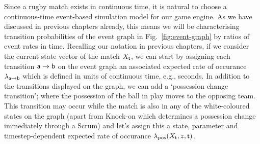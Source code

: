 Since a rugby match exists in continuous time, it is natural to choose a continuous-time event-based simulation model for our game engine. As we have discussed in previous chapters already, this means we will be characterising transition probabilities of the event graph in Fig.~\ref{fig:event-graph} by ratios of event rates in time. Recalling our notation in previous chapters, if we consider the current state vector of the match $X_{\sf t}$, we can start by assigning each transition ${\sf a}\rightarrow {\sf b}$ on the event graph an associated expected rate of occurance $\lambda_{{\sf a}\rightarrow {\sf b}}$ which is defined in units of continuous time, e.g., seconds. In addition to the transitions displayed on the graph, we can add a `possession change transition'; where the possession of the ball in play moves to the opposing team. This transition may occur while the match is also in any of the white-coloured states on the graph (apart from {\sf Knock-on} which determines a possession change immediately through a {\sf Scrum}) and let's assign this a state, parameter and timestep-dependent expected rate of occurance $\lambda_{\rm pos}(X_{\sf t}, z, {\sf t})$.

